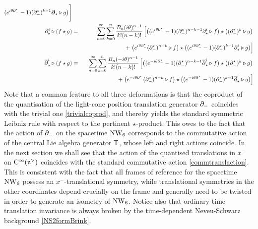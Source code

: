 \begin{eqnarray}
( e^{ i\theta \partial_-^\star}-1) (\partial_-^\star)^{k-1}
 {{\boldsymbol {\partial} }}_\star\triangleright g\bigr)\Biggr] \\\nonumber
\partial^i_\star\triangleright(f\star g)&=&\sum_{n=0}^\infty 
\sum_{k=0}^n \frac{B_n ( i\theta)^{n-1}}{k! (n-k)!} \left[
\bigl(( e^{ i\theta \partial_-^\star}-1) 
(\partial_-^\star)^{n-k-1} \partial^i_\star\triangleright f\bigr) \star 
\bigl((\partial_-^\star)^k\triangleright g\bigr)\right.\\\nonumber &&
\qquad\qquad\qquad\quad
+\left.\bigl( e^{ i\theta \partial_-^\star} (\partial_-^\star)^{n-k}
\triangleright f\bigr) \star \bigl(( e^{ i\theta \partial_-^\star}-1)
 (\partial_-^\star)^{k-1} \partial^i_\star\triangleright g\bigr)\right]
\\\nonumber\overline{\partial}^{ i}_\star\triangleright(f\star g)&=&
\sum_{n=0}^\infty \sum_{k=0}^n \frac{B_n (- i\theta)^{n-1}}{k! (n-k)!}
 \left[\bigl(( e^{- i\theta \partial_-^\star}-1) 
(\partial_-^\star)^{n-k-1} \overline{\partial}^{ i}_\star
\triangleright f\bigr) \star 
\bigl((\partial_-^\star)^k\triangleright g\bigr)\right.\\\nonumber &&
\qquad\qquad\qquad
+\left.\bigl( e^{- i\theta \partial_-^\star} (\partial_-^\star)^{n-k}
\triangleright f\bigr) \star \bigl(( e^{- i\theta \partial_-^\star}-1)
 (\partial_-^\star)^{k-1} \overline{\partial}^{ i}_\star
\triangleright g\bigr)\right]
\end{eqnarray}
Note that a common feature to all three deformations is that the coproduct
of the quantisation of the light-cone position translation generator
$\partial_-$ coincides with the trivial one \eqref{trivialcoprod}, and
thereby yields the standard symmetric Leibniz rule with respect to the
pertinent $\star$-product. This owes to the fact that the action of
$\partial_-$ on the spacetime $\operatorname{NW}_6$ corresponds to the commutative
action of the central Lie algebra generator ${\sf T}$, whose left and right actions
coincide. In the next section we shall see that the action of the
quantised translations in $x^-$ on ${\rm C}^\infty({\mathfrak n}^\vee)$ coincides with
the standard commutative action \eqref{commtranslaction}. This is
consistent with the fact that all frames of reference for the
spacetime $\operatorname{NW}_6$ possess an $x^-$-translational symmetry, while
translational symmetries in the other coordinates depend crucially on
the frame and generally need to be twisted in order to generate an
isometry of $\operatorname{NW}_6$. Notice also that ordinary time translation
invariance is always broken by the time-dependent Neveu-Schwarz
background \eqref{NS2formBrink}.

